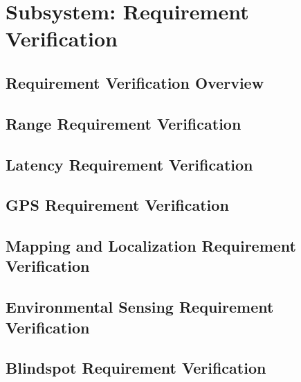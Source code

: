\chapter{Subsystem: Requirement Verification}

\section{Requirement Verification Overview}

\section{Range Requirement Verification}

\section{Latency Requirement Verification}

\section{GPS Requirement Verification}

\section{Mapping and Localization Requirement Verification}

\section{Environmental Sensing Requirement Verification}

\section{Blindspot Requirement Verification}